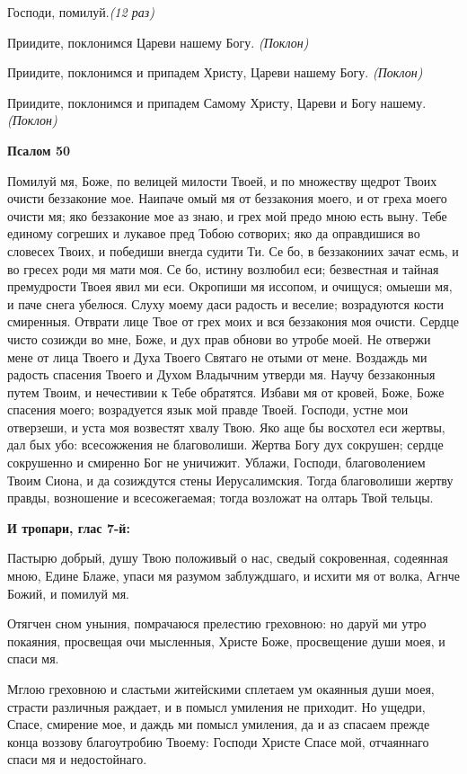 Господи, помилуй.\itshape  (12 раз)\normalfont{}


Приидите, поклонимся Цареви нашему Богу. \itshape (Поклон)\normalfont{}


Приидите, поклонимся и припадем Христу, Цареви нашему Богу. \itshape (Поклон)\normalfont{}


Приидите, поклонимся и припадем Самому Христу, Цареви и Богу нашему.\itshape (Поклон)\normalfont{}




\bfseries Псалом 50\normalfont{}


Помилуй мя, Боже, по велицей милости Твоей, и по множеству щедрот Твоих очисти беззаконие мое. Наипаче омый мя от беззакония моего, и от греха моего очисти мя; яко беззаконие мое аз знаю, и грех мой предо мною есть выну. Тебе единому согреших и лукавое пред Тобою сотворих; яко да оправдишися во словесех Твоих, и победиши внегда судити Ти. Се бо, в беззакониих зачат есмь, и во гресех роди мя мати моя. Се бо, истину возлюбил еси; безвестная и тайная премудрости Твоея явил ми еси. Окропиши мя иссопом, и очищуся; омыеши мя, и паче снега убелюся. Слуху моему даси радость и веселие; возрадуются кости смиренныя. Отврати лице Твое от грех моих и вся беззакония моя очисти. Сердце чисто созижди во мне, Боже, и дух прав обнови во утробе моей. Не отвержи мене от лица Твоего и Духа Твоего Святаго не отыми от мене. Воздаждь ми радость спасения Твоего и Духом Владычним утверди мя. Научу беззаконныя путем Твоим, и нечестивии к Тебе обратятся. Избави мя от кровей, Боже, Боже спасения моего; возрадуется язык мой правде Твоей. Господи, устне мои отверзеши, и уста моя возвестят хвалу Твою. Яко аще бы восхотел еси жертвы, дал бых убо: всесожжения не благоволиши. Жертва Богу дух сокрушен; сердце сокрушенно и смиренно Бог не уничижит. Ублажи, Господи, благоволением Твоим Сиона, и да созиждутся стены Иерусалимския. Тогда благоволиши жертву правды, возношение и всесожегаемая; тогда возложат на олтарь Твой тельцы.




\bfseries И тропари, глас 7-й: \normalfont{}


Пастырю добрый, душу Твою положивый о нас, сведый сокровенная, содеянная мною, Едине Блаже, упаси мя разумом заблуждшаго, и исхити мя от волка, Агнче Божий, и помилуй мя. 


Отягчен сном уныния, помрачаюся прелестию греховною: но даруй ми утро покаяния, просвещая очи мысленныя, Христе Боже, просвещение души моея, и спаси мя. 


Мглою греховною и сластьми житейскими сплетаем ум окаянныя души моея, страсти различныя раждает, и в помысл умиления не приходит. Но ущедри, Спасе, смирение мое, и даждь ми помысл умиления, да и аз спасаем прежде конца воззову благоутробию Твоему: Господи Христе Спасе мой, отчаяннаго спаси мя и недостойнаго. 


